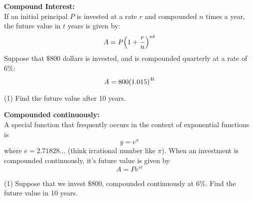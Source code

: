 \documentclass[../mathNotesPreamble]{subfiles}
\begin{document}
  \begin{ex*}
    \textbf{Compound Interest:}\\
    If an initial principal $P$ is invested at a rate $r$ and compounded $n$ times a year, the future value in $t$ years is given by:
      \[A=P{\left(1+\frac{r}{n}\right)}^{nt}\]
    Suppose that $\$800$ dollars is invested, and is compounded quarterly at a rate of $6\%$:
      \[A=800{\left(1.015\right)}^{4t}\]

  \end{ex*}
  \begin{extasks}[after-item-skip=\stretch{1}](1)
    \task Find the future value after 10 years.
  \end{extasks}
  \pagebreak

  \begin{ex*}
    \textbf{Compounded continuously:}\\
    A special function that frequently occurs in the context of exponential functions is
      \[y=e^x\]
    where $e= 2.71828...$ (think irrational number like $\pi$). When an investment is compounded continuously, it's future value is given by
      \[A=Pe^{rt}\]
  \end{ex*}
  \begin{extasks}[after-item-skip=\stretch{1}](1)
    \task Suppose that we invest $\$800$, compounded continuously at $6\%$. Find the future value in 10 years.
  \end{extasks}
  \pagebreak


  \pagebreak
\end{document}
